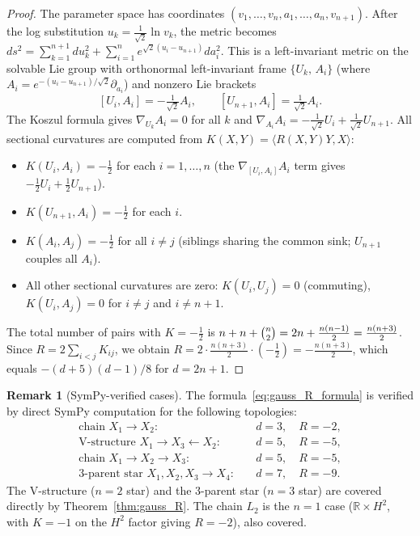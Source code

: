 \documentclass[11pt]{article}
\theoremstyle{definition}
\newtheorem{remark}[theorem]{Remark}
\begin{document}
\begin{proof}
The parameter space has coordinates $(v_1,\ldots,v_n,a_1,\ldots,a_n,v_{n+1})$.  
After the log substitution $u_k = \tfrac{1}{\sqrt{2}}\ln v_k$, the metric becomes
$ds^2 = \sum_{k=1}^{n+1} du_k^2 + \sum_{i=1}^n e^{\sqrt{2}(u_i-u_{n+1})} da_i^2$.
This is a left-invariant metric on the solvable Lie group with orthonormal 
left-invariant frame $\{U_k,\, A_i\}$ (where $A_i = e^{-(u_i-u_{n+1})/\sqrt{2}}\partial_{a_i}$) 
and nonzero Lie brackets
\[
  [U_i, A_i] = -\tfrac{1}{\sqrt{2}} A_i, \qquad [U_{n+1}, A_i] = \tfrac{1}{\sqrt{2}} A_i.
\]
The Koszul formula gives $\nabla_{U_k}A_i = 0$ for all $k$ and 
$\nabla_{A_i}A_i = -\tfrac{1}{\sqrt{2}}U_i + \tfrac{1}{\sqrt{2}}U_{n+1}$.  
All sectional curvatures are computed from $K(X,Y) = \langle R(X,Y)Y, X\rangle$:
\begin{itemize}
\item $K(U_i, A_i) = -\tfrac{1}{2}$ for each $i=1,\ldots,n$ 
  (the $\nabla_{[U_i,A_i]}A_i$ term gives $-\tfrac{1}{2}U_i+\tfrac{1}{2}U_{n+1}$).
\item $K(U_{n+1}, A_i) = -\tfrac{1}{2}$ for each $i$.
\item $K(A_i, A_j) = -\tfrac{1}{2}$ for all $i \neq j$ 
  (siblings sharing the common sink; $U_{n+1}$ couples all $A_i$).
\item All other sectional curvatures are zero: 
  $K(U_i,U_j)=0$ (commuting), $K(U_i,A_j)=0$ for $i\neq j$ and $i\neq n+1$.
\end{itemize}
The total number of pairs with $K = -\tfrac{1}{2}$ is 
$n + n + \tbinom{n}{2} = 2n + \tfrac{n(n-1)}{2} = \tfrac{n(n+3)}{2}$.
Since $R = 2\sum_{i<j}K_{ij}$, we obtain $R = 2 \cdot \tfrac{n(n+3)}{2} \cdot (-\tfrac{1}{2}) = -\tfrac{n(n+3)}{2}$, 
which equals $-(d+5)(d-1)/8$ for $d=2n+1$.
\end{proof}

\begin{remark}[SymPy-verified cases]\label{rem:gauss_cases}
The formula~\eqref{eq:gauss_R_formula} is verified by direct SymPy computation 
for the following topologies:
\begin{align*}
  \text{chain } X_1 \to X_2: &\quad d=3,\quad R=-2,\\
  \text{V-structure } X_1{\to}X_3{\leftarrow}X_2: &\quad d=5,\quad R=-5,\\
  \text{chain } X_1 \to X_2 \to X_3: &\quad d=5,\quad R=-5,\\
  \text{3-parent star } X_1,X_2,X_3 \to X_4: &\quad d=7,\quad R=-9.
\end{align*}
The V-structure ($n=2$ star) and the $3$-parent star ($n=3$ star) are 
covered directly by Theorem~\ref{thm:gauss_R}.  The chain $L_2$ 
is the $n=1$ case ($\mathbb{R}\times H^2$, with $K=-1$ on the $H^2$ 
factor giving $R=-2$), also covered.
\end{remark}
\end{document}

